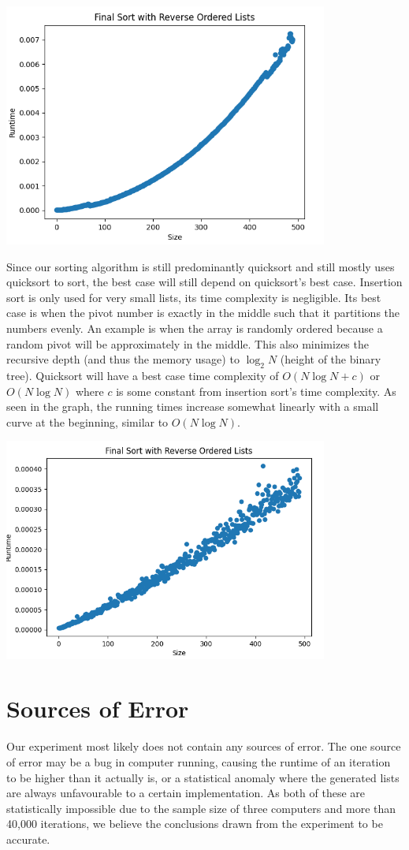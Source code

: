 \documentclass{article}
\begin{document}
\includegraphics[width=0.8\textwidth]{finalSortReverseOrderedLists}

Since our sorting algorithm is still predominantly quicksort and still mostly uses quicksort to sort, the best case will still depend on quicksort’s best case. Insertion sort is only used for very small lists, its time complexity is negligible. Its best case is when the pivot number is exactly in the middle such that it partitions the numbers evenly. An example is when the array is randomly ordered because a random pivot will be approximately in the middle. This also minimizes the recursive depth (and thus the memory usage) to $\log_2 N$ (height of the binary tree). Quicksort will have a best case time complexity of $O(N\log N + c)$ or $O(N\log N)$ where $c$ is some constant from insertion sort’s time complexity. As seen in the graph, the running times increase somewhat linearly with a small curve at the beginning, similar to $O(N\log N)$.

\includegraphics[width=0.8\textwidth]{finalSortRandomLists}

\section*{Sources of Error}
Our experiment most likely does not contain any sources of error. The one source of error may be a bug in computer running, causing the runtime of an iteration to be higher than it actually is, or a statistical anomaly where the generated lists are always unfavourable to a certain implementation. As both of these are statistically impossible due to the sample size of three computers and more than 40,000 iterations, we believe the conclusions drawn from the experiment to be accurate.
\end{document}
